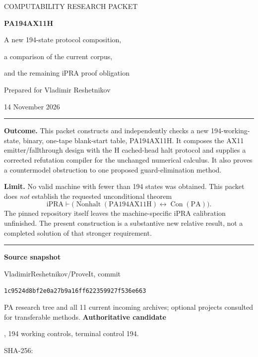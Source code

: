 \documentclass[11pt,a4paper]{article}
\newcommand{\iPRA}{\mathrm{iPRA}}
\newcommand{\PA}{\mathrm{PA}}
\newcommand{\Con}{\operatorname{Con}}
\newcommand{\Nonhalt}{\operatorname{Nonhalt}}
\newcommand{\commit}{\texttt{1c9524d8bf2e0a27b9a16ff622359927f536e663}}
\begin{document}
\hypersetup{pageanchor=false}
\begin{titlepage}
\vspace*{8mm}
{\large COMPUTABILITY RESEARCH PACKET\par}
\vspace{9mm}
{\Huge\bfseries PA194AX11H\par}
\vspace{5mm}
{\LARGE A new 194-state protocol composition,\par
 a comparison of the current corpus,\par
 and the remaining iPRA proof obligation\par}
\vspace{10mm}
{\large Prepared for Vladimir Reshetnikov\par}
{\large 14 November 2026\par}
\vspace{10mm}
\begin{minipage}{\textwidth}
\hrule\vspace{4mm}
\textbf{Outcome.} This packet constructs and independently checks a new
194-working-state, binary, one-tape blank-start table, PA194AX11H.
It composes the AX11 emitter/fallthrough design with the H cached-head
halt protocol and supplies a corrected refutation compiler for the
unchanged numerical calculus. It also proves a countermodel obstruction
to one proposed guard-elimination method.

\textbf{Limit.} No valid machine with fewer than 194 states was obtained.
This packet does \emph{not} establish the requested unconditional theorem
\[
 \iPRA\vdash\bigl(\Nonhalt(\mathrm{PA194AX11H})
                    \leftrightarrow\Con(\PA)\bigr).
\]
The pinned repository itself leaves the machine-specific iPRA calibration
unfinished. The present construction is a substantive new relative result,
not a completed solution of that stronger requirement.
\vspace{4mm}\hrule
\end{minipage}
\vfill
\textbf{Source snapshot}\par
VladimirReshetnikov/ProveIt, commit\par
\commit\par
PA research tree and all 11 current incoming archives; optional projects
consulted for transferable methods.
\vspace{6mm}
\textbf{Authoritative candidate}\par
{}, 194 working controls, terminal control 194.\par
SHA-256:\par
{}
\end{titlepage}
\end{document}
